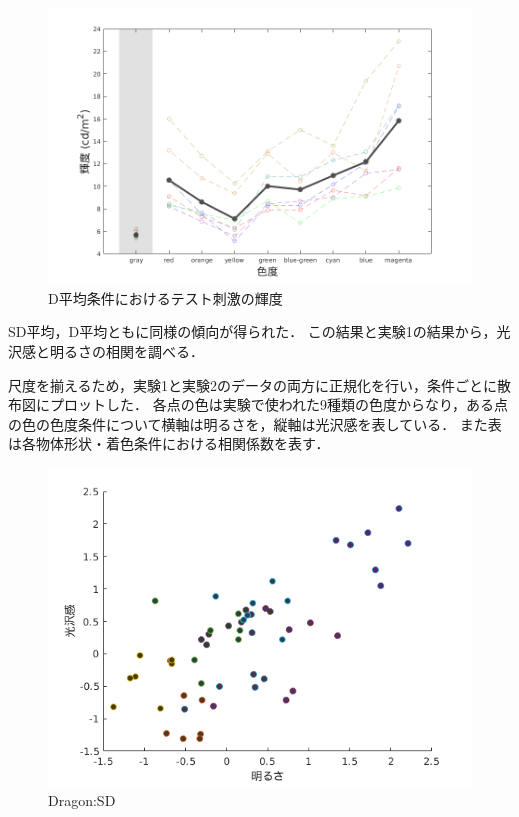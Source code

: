     \begin{figure}[h]
        \centering
        \includegraphics[width=14.0cm]{./img/ex2_res_SD_p.png}
        \caption{D平均条件におけるテスト刺激の輝度}
        \label{ex2_D}
    \end{figure}

    SD平均，D平均ともに同様の傾向が得られた．
    この結果と実験1の結果から，光沢感と明るさの相関を調べる．

    尺度を揃えるため，実験1と実験2のデータの両方に正規化を行い，条件ごとに散布図にプロットした．
    各点の色は実験で使われた9種類の色度からなり，ある点の色の色度条件について横軸は明るさを，縦軸は光沢感を表している．
    また表は各物体形状・着色条件における相関係数を表す．

    \begin{figure}[h]
        \centering
        \includegraphics[width=12.0cm]{./img/ex3_DSD.png}
        \caption{Dragon:SD}
        \label{ex3_DSD}
    \end{figure}

